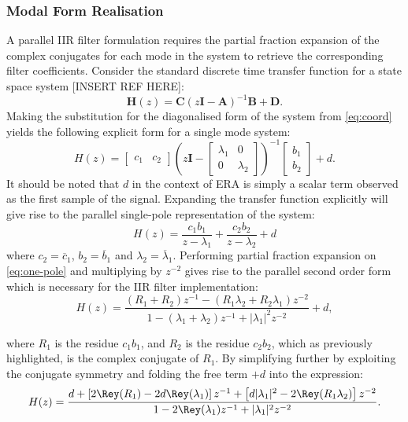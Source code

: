 \subsubsection{Modal Form Realisation}
\label{sec:modal-form}
A parallel IIR filter formulation requires the partial fraction expansion of the complex conjugates for each mode in the system to retrieve the corresponding filter coefficients. Consider the standard discrete time transfer function for a state space system [INSERT REF HERE]:
\begin{equation}
\label{eq:ss-tf}
    \mathbf{H}(z) = \mathbf{C}(z \mathbf{I} - \mathbf{A})^{-1} \mathbf{B} + \mathbf{D}.
\end{equation}
Making the substitution for the diagonalised form of the system from \eqref{eq:coord} yields the following explicit form for a single mode system:
\begin{equation}
\label{eq:modal}
    H(z) = \begin{bmatrix} c_1 & c_2 \end{bmatrix} \left( z \mathbf{I} - \begin{bmatrix} \lambda_1 & 0 \\ 0 & \lambda_2 \end{bmatrix} \right)^{-1}
    \begin{bmatrix} b_1 \\ b_2 \end{bmatrix} + d.
\end{equation}
It should be noted that $d$ in the context of ERA is simply a scalar term observed as the first sample of the signal. Expanding the transfer function explicitly will give rise to the parallel single-pole representation of the system:
\begin{equation}
\label{eq:one-pole}
    H(z) = \frac{c_1 b_1}{z - \lambda_1} + \frac{c_2 b_2}{z - \lambda_2} + d
\end{equation}
where $c_2 = \overline{c}_1$, $b_2 = \overline{b}_1$ and $\lambda_2 = \overline{\lambda}_1$.
Performing partial fraction expansion on \eqref{eq:one-pole} and multiplying by $z^{-2}$ gives rise to the parallel second order form which is necessary for the IIR filter implementation:
\begin{equation}
\label{eq:second-order}
    H(z) = \frac{(R_1 + R_2)z^{-1} - (R_1 \lambda_2 + R_2 \lambda_1)z^{-2}}{1 - (\lambda_1 + \lambda_2)z^{-1} + |\lambda_1|^{2}z^{-2}} + d,
\end{equation}

where $R_1$ is the residue $c_1 b_1$, and $R_2$ is the residue $c_2 b_2$, which as previously highlighted, is the complex conjugate of $R_1$.
By simplifying further by exploiting the conjugate symmetry and folding the free term $+d$ into the expression:
\begin{equation}
\label{eq:full-parallel}
    H(z) = \frac{d + \left[2\Rey(R_1) - 2d\Rey(\lambda_1)\right]z^{-1} + \left[d|\lambda_1|^2 - 2\Rey(R_1\lambda_2)\right]z^{-2}}{1 - 2\Rey(\lambda_1)z^{-1} + |\lambda_1|^2 z^{-2}}.
\end{equation}

